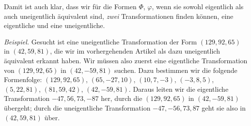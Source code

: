 Damit ist auch klar, dass wir für die Formen $\Phi$, $\varphi$, wenn sie sowohl eigentlich als auch uneigentlich äquivalent sind, \textit{zwei} Transformationen finden können, eine eigentliche und eine uneigentliche.

\textit{Beispiel.} Gesucht ist eine uneigentliche Transformation der Form $(129,92,65)$ in $(42,59,81)$, die wir im vorhergehenden Artikel als dazu uneigentlich äquivalent erkannt haben. Wir müssen also zuerst eine eigentliche Transformation von $(129,92,65)$ in $(42,-59,81)$ suchen. Dazu bestimmen wir die folgende Formenfolge: $(129,92,65)$, $(65,-27,10)$, $(10,7,-3)$, $(-3,8,5)$, $(5,22,81)$, $(81,59,42)$, $(42,-59,81)$. Daraus leiten wir die eigentliche Transformation $-47,56,73,-87$ her, durch die $(129,92,65)$ in $(42,-59,81)$ übergeht; durch die uneigentliche Transformation $-47,\allowbreak-56,\allowbreak73,\allowbreak87$ geht sie also in $(42,59,81)$ über.
